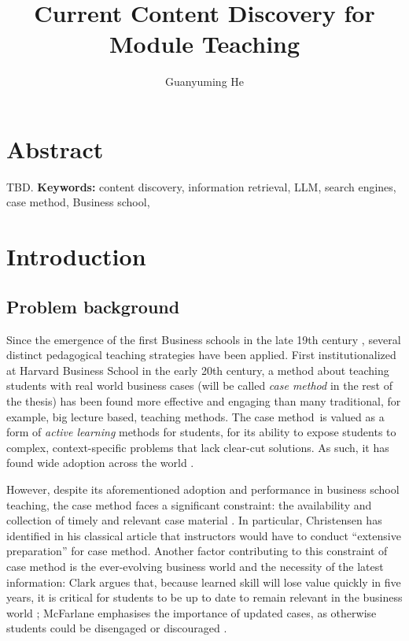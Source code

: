 \documentclass[project-plan]{report-template}
\title{Current Content Discovery for Module Teaching}
\author{Guanyuming He}
\newcommand\casemethod{case method}
\begin{document}
\maketitlepage  

\section*{Abstract}
TBD.
\textbf{Keywords:} content discovery, information retrieval, LLM, search engines, \casemethod, Business school,

\section{Introduction}
\subsection{Problem background}
Since the emergence of the first Business schools in the late 19th century
\cite{first.bis.school.1, first.bis.school.2}, several distinct pedagogical
teaching strategies have been applied.  First institutionalized at Harvard
Business School \cite{case.method.origin.1, case.method.origin.2} in the early
20th century, a method about teaching students with real world business cases
(will be called \emph{\casemethod} in the rest of the thesis) has been found
more effective and engaging \cite{case.method.support.1, case.method.support.2,
case.method.support.3} than many traditional, for example, big lecture based,
teaching methods. The \casemethod\ is valued as a form of \emph{active
learning} methods for students, for its ability to expose students to complex,
context-specific problems that lack clear-cut solutions. As such, it has found
wide adoption across the world \cite{case.method.adoption.1,
case.method.adoption.2}.

However, despite its aforementioned adoption and performance in business school
teaching, the case method faces a significant constraint: the availability and
collection of timely and relevant case material \cite{case.method.limit.1,
case.method.limit.3}. In particular, Christensen has identified in his classical
article that instructors would have to conduct ``extensive preparation''
\cite{case.method.limit.2} for case method. Another factor contributing to this
constraint of case method is the ever-evolving business world and the necessity
of the latest information: Clark argues that, because learned skill will lose
value quickly in five years, it is critical for students to be up to date to
remain relevant in the business world \cite{case.method.limit.4}; McFarlane
emphasises the importance of updated cases, as otherwise students could be
disengaged or discouraged \cite{case.method.limit.5}.
\end{document}
